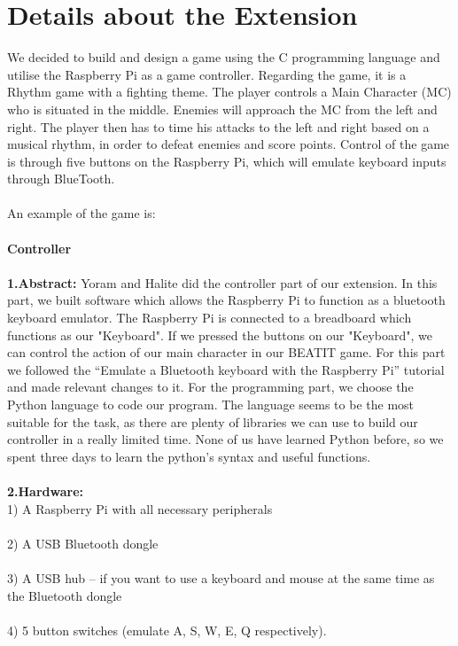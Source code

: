 \documentclass[a4paper]{article}
\begin{document}
\section{Details about the Extension}
We decided to build and design a game using the C programming language and utilise the Raspberry Pi as a game controller. Regarding the game, it is a Rhythm game with a fighting theme. The player controls a Main Character (MC) who is situated in the middle. Enemies will approach the MC from the left and right. The player then has to time his attacks to the left and right based on a musical rhythm, in order to defeat enemies and score points. Control of the game is through five buttons on the Raspberry Pi, which will emulate keyboard inputs through BlueTooth.
\\\\
An example of the game is: \\\\
\textbf{Controller}\\\\
\textbf{1.Abstract:}  Yoram and Halite did the controller part of our extension. In this part, we built software which allows the Raspberry Pi to function as a bluetooth keyboard emulator. The Raspberry Pi is connected to a breadboard which functions as our "Keyboard". If we pressed the buttons on our "Keyboard", we can control the action of our main character in our BEATIT game. For this part we followed the “Emulate a Bluetooth keyboard with the Raspberry Pi” tutorial and made relevant changes to it. 
For the programming part, we choose the Python language to code our program. The language seems to be the most suitable for the task, as there are plenty of libraries we can use to build our controller in a really limited time. None of us have learned Python before, so we spent three days to learn the python’s syntax and useful functions.
\\\\
\textbf{2.Hardware:}\\
1) A Raspberry Pi with all necessary peripherals   \\\\
2) A USB Bluetooth dongle \\\\
3) A USB hub – if you want to use a keyboard and mouse at the same time as the Bluetooth dongle  \\\\
4) 5 button switches  (emulate A, S, W, E, Q respectively).  \\\\
\end{document}
